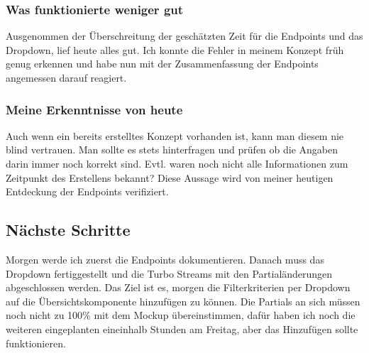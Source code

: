 \subsubsection*{Was funktionierte weniger gut}
Ausgenommen der Überschreitung der geschätzten Zeit für die Endpoints und das Dropdown, lief heute alles gut.
Ich konnte die Fehler in meinem Konzept früh genug erkennen und habe nun mit der Zusammenfassung der Endpoints angemessen darauf reagiert.  

\subsubsection*{Meine Erkenntnisse von heute}
Auch wenn ein bereits erstelltes Konzept vorhanden ist, kann man diesem nie blind vertrauen. Man sollte es stets hinterfragen und prüfen
ob die Angaben darin immer noch korrekt sind. Evtl. waren noch nicht alle Informationen zum Zeitpunkt des Erstellens bekannt? Diese Aussage wird von meiner 
heutigen Entdeckung der Endpoints verifiziert.

\subsection*{Nächste Schritte}
Morgen werde ich zuerst die Endpoints dokumentieren. Danach muss das Dropdown fertiggestellt und die Turbo Streams mit den Partialänderungen abgeschlossen werden. 
Das Ziel ist es, morgen die Filterkriterien per Dropdown auf die Übersichtskomponente hinzufügen zu können. Die Partials an sich müssen noch nicht zu 100\% mit dem Mockup
übereinstimmen, dafür haben ich noch die weiteren eingeplanten eineinhalb Stunden am Freitag, aber das Hinzufügen sollte funktionieren.

\pagebreak
